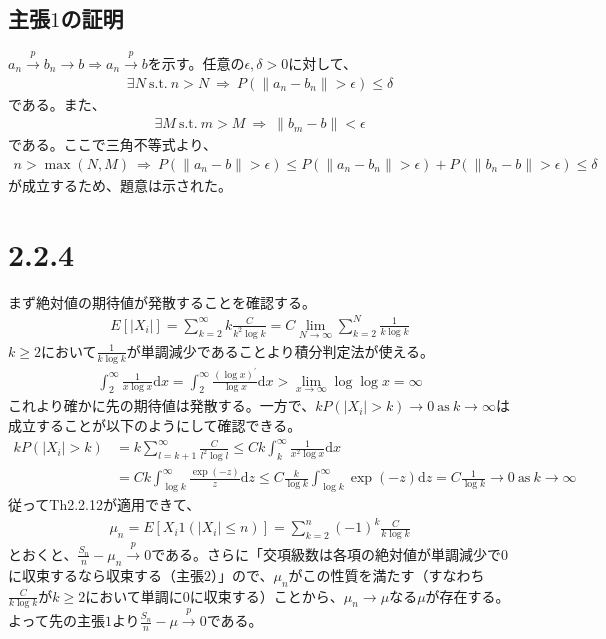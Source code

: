 \documentclass{article}
\begin{document}
\subsection{主張$1$の証明}
$a_n \xrightarrow{p} b_n \to b \Rightarrow a_n \xrightarrow{p} b$を示す。任意の$\epsilon, \delta > 0$に対して、
\begin{align*}
	\exists N\ \text{s.t.}\ n > N\ \Rightarrow\ P(\| a_n -b_n \| > \epsilon) \leq \delta
\end{align*}
である。また、
\begin{align*}
	\exists M\ \text{s.t.}\ m > M\ \Rightarrow\ \|b_m-b\| < \epsilon
\end{align*}
である。ここで三角不等式より、
\begin{align*}
	n > \max(N,M)\ \Rightarrow\ P\left( \| a_n - b \| > \epsilon \right) \leq P\left( \| a_n - b_n \| > \epsilon \right) + P\left( \| b_n - b \| > \epsilon \right) \leq \delta
\end{align*}
が成立するため、題意は示された。

\section{2.2.4}
まず絶対値の期待値が発散することを確認する。
\begin{align*}
	E\left[ |X_i| \right] = \sum_{k = 2}^{\infty} k \frac{C}{k^2 \log k} = C \lim_{N \to \infty} \sum_{k = 2}^{N} \frac{1}{k \log k}
\end{align*}
$k \geq 2$において$\frac{1}{k \log k}$が単調減少であることより積分判定法が使える。
\begin{align*}
	\int_2^{\infty} \frac{1}{x\log x} \mathrm{d}x = \int_2^{\infty} \frac{\left( \log x \right)^{\prime}}{\log x} \mathrm{d}x > \lim_{x\to \infty} \log \log x = \infty
\end{align*}
これより確かに先の期待値は発散する。一方で、$k P\left( |X_i| > k \right) \to 0\ \text{as}\ k \to \infty$は成立することが以下のようにして確認できる。
\begin{align*}
	k P\left( |X_i| > k \right) &= k \sum_{l = k+1}^{\infty} \frac{C}{l^2 \log l} \leq Ck \int_k^{\infty} \frac{1}{x^2 \log x} \mathrm{d}x\\
	&= Ck \int_{\log k}^{\infty} \frac{\exp(-z)}{z} \mathrm{d}z \leq C \frac{k}{\log k} \int_{\log k}^{\infty} \exp(-z) \mathrm{d}z = C \frac{1}{\log k} \to 0\ \text{as}\ k \to \infty
\end{align*}
従ってTh2.2.12が適用できて、
\begin{align*}
	\mu_n = E\left[ X_i 1\left( |X_i| \leq n \right) \right] = \sum_{k = 2}^{n} (-1)^k \frac{C}{k \log k}
\end{align*}
とおくと、$\frac{S_n}{n} - \mu_n \xrightarrow{p} 0$である。さらに「交項級数は各項の絶対値が単調減少で$0$に収束するなら収束する（主張$2$）」ので、$\mu_n$がこの性質を満たす（すなわち$\frac{C}{k\log k}$が$k \geq2$において単調に$0$に収束する）ことから、$\mu_n \to \mu$なる$\mu$が存在する。よって先の主張$1$より$\frac{S_n}{n} - \mu \xrightarrow{p} 0$である。
\end{document}
